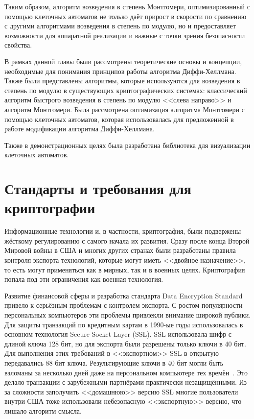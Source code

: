 \documentclass[times,specification,annotation]{itmo-student-thesis}
\begin{document}
Таким образом, алгоритм возведения в степень Монтгомери, оптимизированный с помощью клеточных автоматов не только даёт
прирост в скорости по сравнению с другими алгоритмами возведения в степень по модулю, но и предоставляет возможности
для аппаратной реализации и важные с точки зрения безопасности свойства.

\finishrelatedwork
\chapterconclusion

В рамках данной главы были рассмотрены теоретические основы и концепции, необходимые для понимания принципов работы алгоритма Диффи-Хеллмана.
Также были представлены алгоритмы, которые используются для возведения в степень по модулю в существующих криптографических системах:
классический алгоритм быстрого возведения в степень по модулю <<слева направо>> и алгоритм Монтгомери.
Была рассмотрена оптимизация алгоритма Монтгомери с помощью клеточных автоматов, которая использовалась для предложенной
в работе модификации алгоритма Диффи-Хеллмана.

Также в демонстрационных целях была разработана библиотека для визуализации клеточных автоматов.

\chapter{Стандарты и требования для криптографии}

Информационные технологии и, в частности, криптография, были подвержены жёсткому регулированию с самого начала их развития.
Сразу после конца Второй Мировой войны в США и многих других странах были разработаны правила контроля экспорта
технологий, которые могут иметь <<двойное назначение>>, то есть могут применяться как в мирных, так и в военных целях.
Криптография попала под эти ограничения как военная технология.

Развитие финансовой сферы и разработка стандарта Data Encryption Standard привело к серьёзным проблемам с контролем экспорта.
С ростом популярности персональных компьютеров эти проблемы привлекли внимание широкой публики.
Для защиты транзакций по кредитным картам в 1990-ые годы использовалась в основном технология Secure Socket Layer (SSL).
SSL использовала шифр с длиной ключа 128 бит, но для экспорта были разрешены только ключи в 40 бит.
Для выполнения этих требований в <<экспортном>> SSL в открытую передавались 88 бит ключа.
Результирующие ключи в 40 бит могли быть взломаны за несколько дней даже на персональном компьютере тех времён~\cite{lev01}.
Это делало транзакции с зарубежными партнёрами практически незащищёнными.
Из-за сложности заполучить <<домашнюю>> версию SSL многие пользователи внутри США тоже использовали небезопасную
<<экспортную>> версию, что лишало алгоритм смысла.
\end{document}
